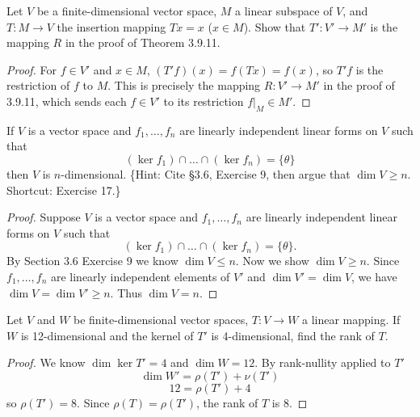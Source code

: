 \begin{tcolorbox}[title=Exercise 19, breakable]
    Let $V$ be a finite-dimensional vector space, $M$ a linear subspace of $V$, 
    and $T : M \to V$ the insertion mapping $Tx = x$ ($x \in M$). Show that 
    $T' : V' \to M'$ is the mapping $R$ in the proof of Theorem 3.9.11.
\end{tcolorbox}

\begin{proof}
    For $f \in V'$ and $x \in M$, $(T'f)(x) = f(Tx) = f(x)$,
    so $T'f$ is the restriction of $f$ to $M$.
    This is precisely the mapping $R : V' \to M'$ in the proof of 3.9.11,
    which sends each $f \in V'$ to its restriction $f|_M \in M'$.
\end{proof}

\begin{tcolorbox}[title=Exercise 20, breakable]
    If $V$ is a vector space and $f_1, \ldots, f_n$ are linearly independent linear 
    forms on $V$ such that 
    \[(\ker f_1) \cap \ldots \cap (\ker f_n) = \{\theta\}\]
    then $V$ is $n$-dimensional. \{Hint: Cite \S 3.6, Exercise 9, then argue that 
    $\dim V \ge n$. Shortcut: Exercise 17.\}
\end{tcolorbox}

\begin{proof}
    Suppose $V$ is a vector space and $f_1, \ldots, f_n$ are linearly independent linear
    forms on $V$ such that
    \[(\ker f_1) \cap \ldots \cap (\ker f_n) = \{\theta\}.\]
    By Section 3.6 Exercise 9 we know $\dim V \le n$.
    Now we show $\dim V \ge n$.
    Since $f_1, \ldots, f_n$ are linearly independent elements of $V'$ and $\dim V' = \dim V$,
    we have $\dim V = \dim V' \ge n$.
    Thus $\dim V = n$.
\end{proof}

\begin{tcolorbox}[title=Exercise 21, breakable]
    Let $V$ and $W$ be finite-dimensional vector spaces, $T : V \to W$ a linear 
    mapping. If $W$ is 12-dimensional and the kernel of $T'$ is 4-dimensional, 
    find the rank of $T$.
\end{tcolorbox}

\begin{proof}
    We know $\dim \ker T' = 4$ and $\dim W = 12$.
    By rank-nullity applied to $T'$
    \[\dim W' = \rho(T') + \nu(T')\]
    \[12 = \rho(T') + 4\]
    so $\rho(T') = 8$. Since $\rho(T) = \rho(T')$, the rank of $T$ is $8$.
\end{proof}